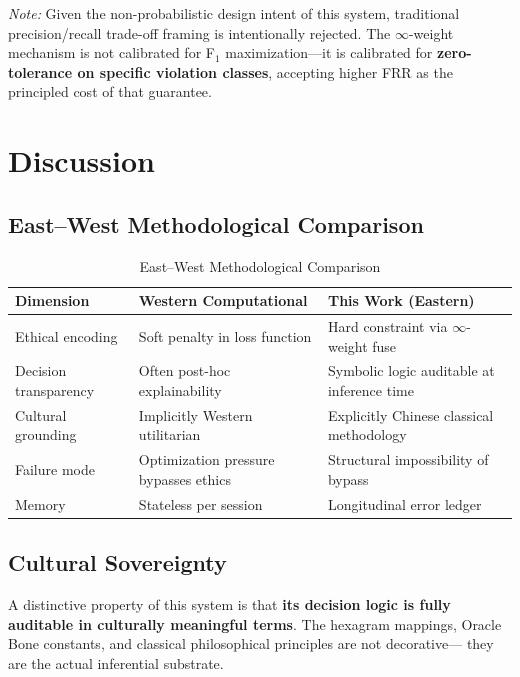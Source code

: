\documentclass[conference]{IEEEtran}
\begin{document}
\textit{Note:} Given the non-probabilistic design intent of this
system, traditional precision/recall trade-off framing is
intentionally rejected. The $\infty$-weight mechanism is not
calibrated for F$_1$ maximization---it is calibrated for
\textbf{zero-tolerance on specific violation classes}, accepting
higher FRR as the principled cost of that guarantee.

\section{Discussion}

\subsection{East--West Methodological Comparison}

\begin{table}[!ht]
\caption{East--West Methodological Comparison}
\label{tab:comparison}
\centering
\renewcommand{\arraystretch}{1.15}
\begin{tabular}{p{3.2cm}p{4.0cm}p{4.0cm}}
\toprule
\textbf{Dimension} & \textbf{Western Computational} &
                     \textbf{This Work (Eastern)} \\
\midrule
Ethical encoding &
  Soft penalty in loss function &
  Hard constraint via $\infty$-weight fuse \\
Decision transparency &
  Often post-hoc explainability &
  Symbolic logic auditable at inference time \\
Cultural grounding &
  Implicitly Western utilitarian &
  Explicitly Chinese classical methodology \\
Failure mode &
  Optimization pressure bypasses ethics &
  Structural impossibility of bypass \\
Memory &
  Stateless per session &
  Longitudinal error ledger \\
\bottomrule
\end{tabular}
\end{table}

\subsection{Cultural Sovereignty}

A distinctive property of this system is that
\textbf{its decision logic is fully auditable in culturally
meaningful terms}. The hexagram mappings, Oracle Bone constants,
and classical philosophical principles are not decorative---
they are the actual inferential substrate.
\end{document}
